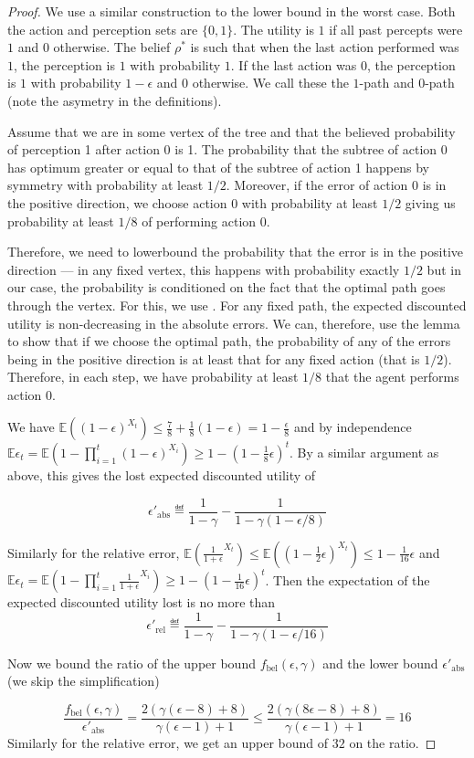\begin{proof}
We use a similar construction to the lower bound in the worst case. Both the action and perception sets are $\{0,1\}$. The utility is $1$ if all past percepts were $1$ and $0$ otherwise. The belief $\rho^*$ is such that when the last action performed was $1$, the perception is $1$ with probability $1$. If the last action was $0$, the perception is $1$ with probability $1-\epsilon$ and $0$ otherwise. We call these the $1$-path and $0$-path (note the asymetry in the definitions).

Assume that we are in some vertex of the tree and that the believed probability of perception 1 after action 0 is 1. The probability that the subtree of action 0 has optimum greater or equal to that of the subtree of action 1 happens by symmetry with probability at least $1/2$. Moreover, if the error of action $0$ is in the positive direction, we choose action $0$ with probability at least $1/2$ giving us probability at least $1/8$ of performing action 0.

Therefore, we need to lowerbound the probability that the error is in the positive direction --- in any fixed vertex, this happens with probability exactly $1/2$ but in our case, the probability is conditioned on the fact that the optimal path goes through the vertex. For this, we use . For any fixed path, the expected discounted utility is non-decreasing in the absolute errors. We can, therefore, use the lemma to show that if we choose the optimal path, the probability of any of the errors being in the positive direction is at least that for any fixed action (that is $1/2$). Therefore, in each step, we have probability at least $1/8$ that the agent performs action $0$.

We have $\mathbb{E}((1-\epsilon)^{X_t}) \leq \frac{7}{8} + \frac{1}{8}(1-\epsilon) = 1-\frac{\epsilon}{8}$ and by independence $\mathbb{E}\epsilon_t = \mathbb{E}(1-\prod_{i=1}^t (1-\epsilon)^{X_i}) \geq 1-(1-\frac{1}{8}\epsilon)^t$. By a similar argument as above, this gives the lost expected discounted utility of 

\[
\epsilon'_\text{abs} \eqdef \frac{1}{1-\gamma} - \frac{1}{1- \gamma(1-\epsilon/8)}
\]

Similarly for the relative error, $\mathbb{E}(\frac{1}{1+\epsilon}^{X_t}) \leq \mathbb{E}((1-\frac{1}{2}\epsilon)^{X_t}) \leq 1-\frac{1}{16}\epsilon$ and $\mathbb{E}\epsilon_t = \mathbb{E}(1-\prod_{i=1}^t \frac{1}{1+\epsilon}^{X_i}) \geq 1-(1-\frac{1}{16}\epsilon)^t$. Then the expectation of the expected discounted utility lost is no more than
\[
\epsilon'_\text{rel} \eqdef \frac{1}{1-\gamma} - \frac{1}{1- \gamma(1-\epsilon/16)}
\]

Now we bound the ratio of the upper bound $f_\text{bel}(\epsilon, \gamma)$ and the lower bound $\epsilon'_\text{abs}$ (we skip the simplification)

\[
\frac{f_\text{bel}(\epsilon, \gamma)}{\epsilon'_\text{abs}} = \frac{2 (\gamma  (\epsilon -8)+8)}{\gamma  (\epsilon -1)+1} \leq  \frac{2 (\gamma  (8\epsilon -8)+8)}{\gamma  (\epsilon -1)+1} = 16
\]
Similarly for the relative error, we get an upper bound of $32$ on the ratio.

\end{proof}

